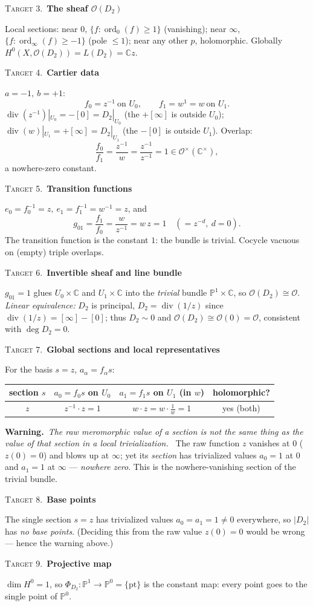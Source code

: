 \documentclass[11pt]{article}
\newcommand{\PP}{\mathbb P}
\newcommand{\CC}{\mathbb C}
\newcommand{\OO}{\mathcal O}
\newcommand{\divisor}{\operatorname{div}}
\newcommand{\ord}{\operatorname{ord}}
\newcommand{\target}[2]{\medskip\noindent%
  {\small\textsc{\textcolor{accent}{Target #1.}}}\ \textbf{\textcolor{inkblue}{#2}}\par\nopagebreak\smallskip}
\newcommand{\warningnote}{\par\smallskip\noindent%
  {\color{polered}\textbf{Warning.}}\ \emph{The raw meromorphic value of a section
  is not the same thing as the value of that section in a local trivialization.}\ }
\theoremstyle{plain}
\theoremstyle{definition}
\begin{document}
\target{3}{The sheaf \(\OO(D_2)\)}
Local sections: near $0$, $\{f:\ord_0(f)\ge1\}$ (vanishing); near $\infty$,
$\{f:\ord_\infty(f)\ge-1\}$ (pole $\le1$); near any other $p$, holomorphic.
Globally $H^0(X,\OO(D_2))=L(D_2)=\CC z$.

\target{4}{Cartier data}
$a=-1,\ b=+1$:
\[
  f_0=z^{-1}\ \text{on }U_0,\qquad f_1=w^{1}=w\ \text{on }U_1 .
\]
$\divisor(z^{-1})|_{U_0}=-[0]=D_2|_{U_0}$ (the $+[\infty]$ is outside $U_0$);
$\divisor(w)|_{U_1}=+[\infty]=D_2|_{U_1}$ (the $-[0]$ is outside $U_1$). Overlap:
\[
  \frac{f_0}{f_1}=\frac{z^{-1}}{w}=\frac{z^{-1}}{z^{-1}}=1\in\OO^\times(\CC^\times),
\]
a nowhere-zero constant.

\target{5}{Transition functions}
$e_0=f_0^{-1}=z,\ e_1=f_1^{-1}=w^{-1}=z$, and
\[
  g_{01}=\frac{f_1}{f_0}=\frac{w}{z^{-1}}=w\,z=1\quad(=z^{-d},\ d=0).
\]
The transition function is the constant $1$: the bundle is trivial. Cocycle
vacuous on (empty) triple overlaps.

\target{6}{Invertible sheaf and line bundle}
$g_{01}=1$ glues $U_0\times\CC$ and $U_1\times\CC$ into the \emph{trivial} bundle
$\PP^1\times\CC$, so $\OO(D_2)\cong\OO$. \emph{Linear equivalence:} $D_2$ is
principal, $D_2=\divisor(1/z)$ since $\divisor(1/z)=[\infty]-[0]$; thus
$D_2\sim0$ and $\OO(D_2)\cong\OO(0)=\OO$, consistent with $\deg D_2=0$.

\target{7}{Global sections and local representatives}
For the basis $s=z$, $a_\alpha=f_\alpha s$:
\begin{center}\small
\begin{tabular}{cccc}
\toprule
section $s$ & $a_0=f_0 s$ on $U_0$ & $a_1=f_1 s$ on $U_1$ (in $w$) & holomorphic?\\
\midrule
$z$ & $z^{-1}\cdot z=1$ & $w\cdot z=w\cdot\tfrac1w=1$ & yes (both)\\
\bottomrule
\end{tabular}
\end{center}
\warningnote
The raw function $z$ vanishes at $0$ ($z(0)=0$) and blows up at $\infty$; yet its
\emph{section} has trivialized values $a_0=1$ at $0$ and $a_1=1$ at $\infty$ ---
\emph{nowhere zero}. This is the nowhere-vanishing section of the trivial bundle.

\target{8}{Base points}
The single section $s=z$ has trivialized values $a_0=a_1=1\neq0$ everywhere, so
$|D_2|$ has \emph{no base points}. (Deciding this from the raw value $z(0)=0$
would be wrong --- hence the warning above.)

\target{9}{Projective map}
$\dim H^0=1$, so $\Phi_{D_2}\colon\PP^1\to\PP^{0}=\{\mathrm{pt}\}$ is the constant
map: every point goes to the single point of $\PP^0$.
\end{document}
